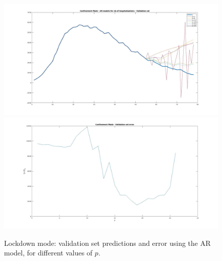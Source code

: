 \documentclass[11pt]{article}
\begin{document}
\begin{figure}[h!]
\includegraphics[scale=0.25]{Conf_val.jpg}
\includegraphics[scale=0.25]{Conf_Err_Val.jpg}
\caption{Lockdown mode: validation set predictions and error using the AR model, for different values of \(p\).}
\label{fig:Conf_val}
\end{figure}
\end{document}
